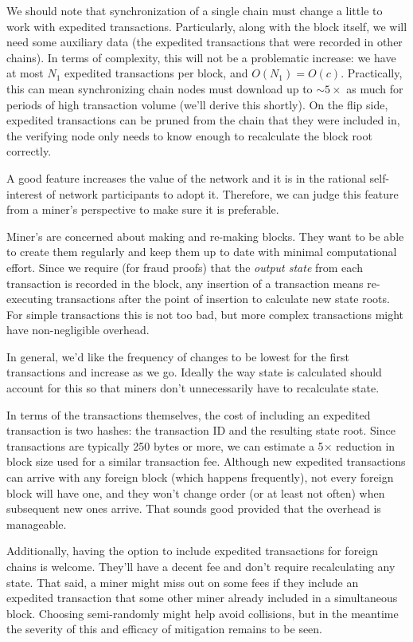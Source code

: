We should note that synchronization of a single chain must change a little to work with expedited transactions.
Particularly, along with the block itself, we will need some auxiliary data (the expedited transactions that were recorded in other chains).
In terms of complexity, this will not be a problematic increase: we have at most $N_1$ expedited transactions per block, and $O(N_1) = O(c)$.
Practically, this can mean synchronizing \cL chain nodes must download up to $\sim 5\times$ as much for periods of high transaction volume (we'll derive this shortly).
On the flip side, expedited transactions can be pruned from the \cR chain that they were included in, the verifying \cR node only needs to know enough to recalculate the block root correctly.


A good feature increases the value of the network and it is in the rational self-interest of network participants to adopt it.
Therefore, we can judge this feature from a miner's perspective to make sure it is preferable.

Miner's are concerned about making and re-making blocks.
They want to be able to create them regularly and keep them up to date with minimal computational effort.
Since we require (for fraud proofs) that the \emph{output state} from each transaction is recorded in the block, any insertion of a transaction means re-executing transactions after the point of insertion to calculate new state roots.
For simple transactions this is not too bad, but more complex transactions might have non-negligible overhead.

In general, we'd like the frequency of changes to be lowest for the first transactions and increase as we go.
Ideally the way state is calculated should account for this so that miners don't unnecessarily have to recalculate state.

In terms of the transactions themselves, the cost of including an expedited transaction is two hashes: the transaction ID and the resulting state root.
Since transactions are typically 250 bytes or more, we can estimate a 5$\times$ reduction in block size used for a similar transaction fee.
Although new expedited transactions can arrive with any foreign block (which happens frequently), not every foreign block will have one, and they won't change order (or at least not often) when subsequent new ones arrive.
That sounds good provided that the overhead is manageable.

Additionally, having the option to include expedited transactions for foreign chains is welcome.
They'll have a decent fee and don't require recalculating any state.
That said, a miner might miss out on some fees if they include an expedited transaction that some other miner already included in a simultaneous block.
Choosing semi-randomly might help avoid collisions, but in the meantime the severity of this and efficacy of mitigation remains to be seen.

